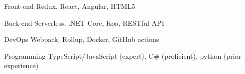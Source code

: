 

\begin{cvskills}

  \cvskill
  {Front-end} %
  {Redux, React, Angular, HTML5} %

  \cvskill
  {Back-end} %
  {Serverless, .NET Core, Koa, RESTful API} %

  \cvskill
  {DevOps} %
  {Webpack, Rollup, Docker, GitHub actions} %

  \cvskill
  {Programming} %
  {TypeScript/JavaScript (expert), C\# (proficient), python (prior experience)} %


\end{cvskills}
